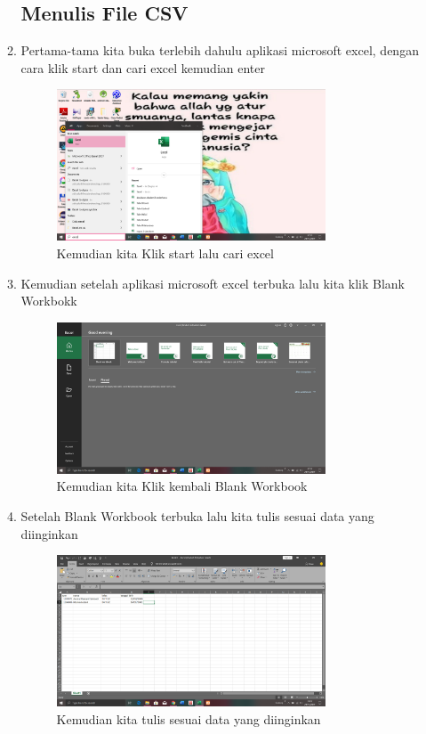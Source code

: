 \documentclass[a4paper, 12pt]{article}
\begin{document}
\begin{enumerate}
\begin{enumerate}
\subsection{Menulis File CSV}
\item Pertama-tama kita buka terlebih dahulu aplikasi microsoft excel, dengan cara klik start dan cari excel kemudian enter
	\begin{figure}[H]
			\includegraphics[width=8cm]{figures/1.png}
			\centering
			\caption{Kemudian kita Klik start lalu cari excel}
	\end{figure} 
\item Kemudian setelah aplikasi microsoft excel terbuka lalu kita klik Blank Workbokk
 	\begin{figure}[H]
			\includegraphics[width=8cm]{figures/2.png}
			\centering
			\caption{Kemudian kita Klik kembali Blank Workbook}
	\end{figure} 
\item Setelah Blank Workbook terbuka lalu kita tulis sesuai data yang diinginkan 
 	\begin{figure}[H]
			\includegraphics[width=8cm]{figures/3.png}
			\centering
			\caption{Kemudian kita tulis sesuai data yang diinginkan}

\end{figure}
\end{enumerate}
\end{enumerate}
\end{document}
